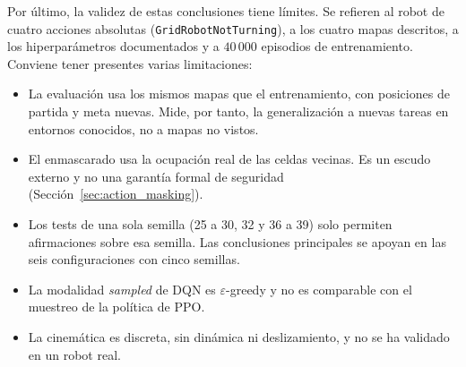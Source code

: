 Por último, la validez de estas conclusiones tiene límites. Se refieren
al robot de cuatro acciones absolutas (\texttt{GridRobotNotTurning}), a los cuatro
mapas descritos, a los
hiperparámetros documentados y a $40\,000$ episodios de entrenamiento.
Conviene tener presentes varias limitaciones:
\begin{itemize}
    \item La evaluación usa los mismos mapas que el entrenamiento, con
    posiciones de partida y meta nuevas. Mide, por tanto, la
    generalización a nuevas tareas en entornos conocidos, no a mapas no
    vistos.
    \item El enmascarado usa la ocupación real de las celdas vecinas. Es
    un escudo externo y no una garantía formal de seguridad
    (Sección~\ref{sec:action_masking}).
    \item Los tests de una sola semilla (25 a 30, 32 y 36 a 39) solo
    permiten afirmaciones sobre esa semilla. Las conclusiones principales
    se apoyan en las seis configuraciones con cinco semillas.
    \item La modalidad \textit{sampled} de DQN es $\varepsilon$-greedy y
    no es comparable con el muestreo de la política de PPO.
    \item La cinemática es discreta, sin dinámica ni deslizamiento, y no
    se ha validado en un robot real.
\end{itemize}
